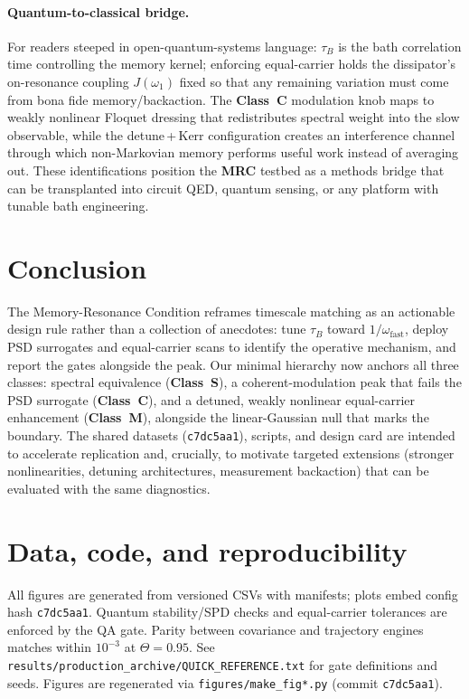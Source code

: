 \documentclass[11pt,letterpaper]{article}
\newcommand{\confighash}{c7dc5aa1}
\DeclareRobustCommand{\mrc}{\textbf{MRC}\xspace}
\DeclareRobustCommand{\classS}{\textbf{Class~S}\xspace}
\DeclareRobustCommand{\classC}{\textbf{Class~C}\xspace}
\DeclareRobustCommand{\classM}{\textbf{Class~M}\xspace}
\begin{document}
\paragraph*{Quantum-to-classical bridge.}
For readers steeped in open-quantum-systems language: $\tau_B$ is the bath correlation time controlling the memory kernel; enforcing equal-carrier holds the dissipator's on-resonance coupling $J(\omega_1)$ fixed so that any remaining variation must come from bona fide memory/backaction. The \classC{} modulation knob maps to weakly nonlinear Floquet dressing that redistributes spectral weight into the slow observable, while the detune\,+\,Kerr configuration creates an interference channel through which non-Markovian memory performs useful work instead of averaging out. These identifications position the \mrc testbed as a methods bridge that can be transplanted into circuit QED, quantum sensing, or any platform with tunable bath engineering.

\section{Conclusion}
The Memory-Resonance Condition reframes timescale matching as an actionable design rule rather than a collection of anecdotes: tune $\tau_B$ toward $1/\omega_{\mathrm{fast}}$, deploy PSD surrogates and equal-carrier scans to identify the operative mechanism, and report the gates alongside the peak. Our minimal hierarchy now anchors all three classes: spectral equivalence (\classS{}), a coherent-modulation peak that fails the PSD surrogate (\classC{}), and a detuned, weakly nonlinear equal-carrier enhancement (\classM{}), alongside the linear-Gaussian null that marks the boundary. The shared datasets (\texttt{\confighash}), scripts, and design card are intended to accelerate replication and, crucially, to motivate targeted extensions (stronger nonlinearities, detuning architectures, measurement backaction) that can be evaluated with the same diagnostics.

\section*{Data, code, and reproducibility}
All figures are generated from versioned CSVs with manifests; plots embed config hash \texttt{\confighash}. Quantum stability/SPD checks and equal-carrier tolerances are enforced by the QA gate. Parity between covariance and trajectory engines matches within $10^{-3}$ at $\Theta=0.95$. See \texttt{results/\allowbreak production\_archive/\allowbreak QUICK\_REFERENCE.txt} for gate definitions and seeds. Figures are regenerated via \texttt{figures/\allowbreak make\_fig*.py} (commit \texttt{\confighash}).
\end{document}

